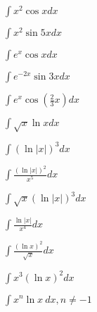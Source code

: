 \begin{multicols}{2}
$\displaystyle \int x^2\cos x dx$

$\displaystyle \int x^2\sin 5x dx$

$\displaystyle \int e^x\cos x dx$

$\displaystyle \int e^{-2x} \sin 3x dx$

$\displaystyle \int e^x\cos (\tfrac{2}{3}x)dx$

$\displaystyle \int \sqrt{x}\ln x dx$

$\displaystyle \int (\ln|x|)^3 dx$

$\displaystyle \int \frac{(\ln|x|)^2}{x^5}dx$

$\displaystyle \int \sqrt{x} (\ln|x|)^3 dx$

$\displaystyle \int \frac{\ln|x|}{x^4}dx$

$\displaystyle \int \frac{(\ln x)^2}{\sqrt{x}}dx$

$\displaystyle \int x^3(\ln x)^2dx$

$\displaystyle \int x^n\ln x \ dx, n\neq -1$
\end{multicols}


